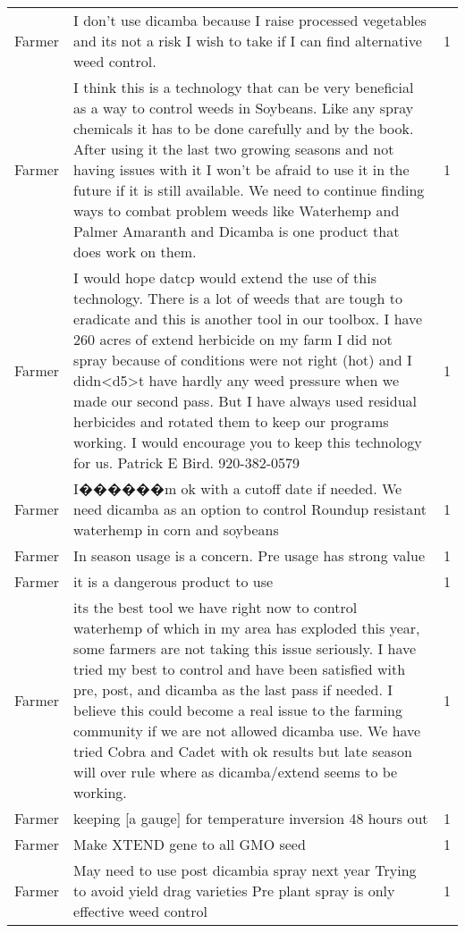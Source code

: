 \documentclass[]{article}
\begin{document}
\begin{table}[H]
\begin{tabular}{llr}
Farmer & I don't use dicamba because I raise processed vegetables and its not a risk I wish to take if I can find alternative weed control. & 1\\
Farmer & I think this is a technology that can be very beneficial as a way to control weeds in Soybeans.  Like any spray chemicals it has to be done carefully and by the book.  After using it the last two growing seasons and not having issues with it I won't be afraid to use it in the future if it is still available.  We need to continue finding ways to combat problem weeds like Waterhemp and Palmer Amaranth and Dicamba is one product that does work on them. & 1\\
Farmer & I would hope datcp would extend the use of this technology.     There is a lot of weeds that are tough to eradicate and this is another tool in our toolbox.  I have 260 acres of extend herbicide on my farm I did not spray because of conditions were not right (hot) and I didn<d5>t have hardly any weed pressure when we made our second pass.   But I have always used residual herbicides and rotated them to keep our programs working.     I would encourage you to keep this technology for us.    Patrick E Bird.  920-382-0579 & 1\\
\addlinespace
Farmer & I������m ok with a cutoff date if needed.  We need dicamba as an option to control Roundup resistant waterhemp in corn and soybeans & 1\\
Farmer & In season usage is a concern.  Pre usage has strong value & 1\\
Farmer & it is a dangerous product to use & 1\\
Farmer & its the best tool we have right now to control waterhemp of which in my area has exploded this year, some farmers are not taking this issue seriously.   I have tried my best to control and have been satisfied with pre, post, and dicamba as the last pass if needed. I believe this could become a real issue to the farming community if we are not allowed dicamba use.  We have tried Cobra and Cadet with ok results but late season will over rule where as dicamba/extend seems to be working. & 1\\
Farmer & keeping [a gauge] for temperature inversion 48 hours out & 1\\
\addlinespace
Farmer & Make XTEND gene to all GMO seed & 1\\
Farmer & May need to use post dicambia spray next year  Trying to avoid yield drag varieties  Pre plant spray is only effective weed control & 1\\

\end{tabular}
\end{table}
\end{document}
